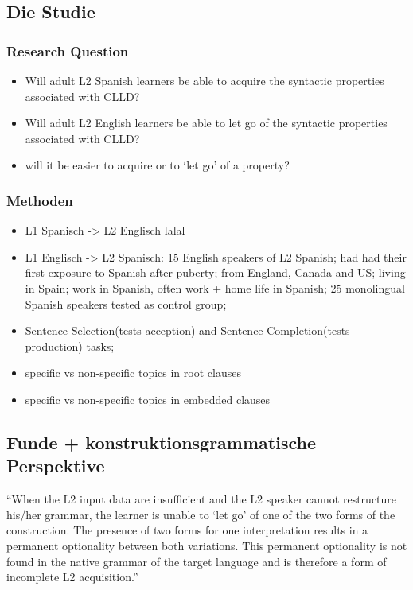 \subsection{Die Studie}
\subsubsection{Research Question}
\begin{itemize}
    \item Will adult L2 Spanish learners be able to acquire the syntactic properties associated with CLLD?
    \item Will adult L2 English learners be able to let go of the syntactic properties associated with CLLD?
    \item will it be easier to acquire or to ‘let go’ of a property?
\end{itemize}

\subsubsection{Methoden}

\begin{itemize}
    \item L1 Spanisch -> L2 Englisch lalal
    \item L1 Englisch -> L2 Spanisch: 15 English speakers of L2 Spanish; had had their first exposure to Spanish after puberty;
        from England, Canada and US; living in Spain; work in Spanish, often work + home life in Spanish;
        25 monolingual Spanish speakers tested as control group;
    \item Sentence Selection(tests acception) and Sentence Completion(tests production) tasks;
    \item specific vs non-specific topics in root clauses
    \item specific vs non-specific topics in embedded clauses
\end{itemize}

\subsection{Funde + konstruktionsgrammatische Perspektive}
\cite{Valenzuela05}
``When the L2 input data are insufficient and the L2 speaker cannot restructure his/her grammar, the learner is unable to `let go' of
one of the two forms of the construction.
The presence of two forms for one interpretation results in a permanent optionality between both variations.
This permanent optionality is not found in the native grammar of the target language and is therefore a form of incomplete L2 acquisition.''


